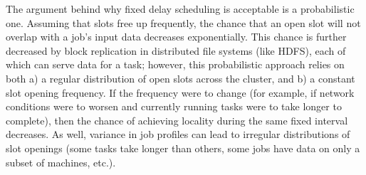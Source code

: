 The argument behind why fixed delay scheduling is acceptable is a probabilistic one. Assuming 
that slots free up frequently, the chance that an open slot will not overlap with a job's 
input data decreases exponentially. This chance is further decreased by block replication 
in distributed file systems (like HDFS), each of which can serve data for a task; however,
this probabilistic approach relies on both a) a regular distribution of open slots across
the cluster, and b) a constant slot opening frequency. If the frequency were to change (for
example, if network conditions were to worsen and currently running tasks were to take longer to complete), 
then the chance of achieving locality during the same fixed interval decreases. As well,
variance in job profiles can lead to irregular distributions of slot openings (some tasks take
longer than others, some jobs have data on only a subset of machines, etc.). 



